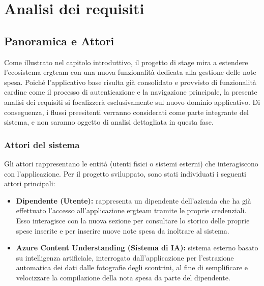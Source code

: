 \chapter{Analisi dei requisiti}
\label{chap:analisi-requisiti}

\section{Panoramica e Attori}
\noindent Come illustrato nel capitolo introduttivo, il progetto di stage mira a estendere l'ecosistema \gls{ergteam} con una nuova funzionalità dedicata alla gestione delle note spesa. Poiché l'applicativo base risulta già consolidato e provvisto di funzionalità cardine come il processo di autenticazione e la navigazione principale, la presente analisi dei requisiti si focalizzerà esclusivamente sul nuovo dominio applicativo. Di conseguenza, i flussi preesitenti verranno considerati come parte integrante del sistema, e non saranno oggetto di analisi dettagliata in questa fase. 

\subsection{Attori del sistema}
\noindent Gli attori rappresentano le entità (utenti fisici o sistemi esterni) che interagiscono con l'applicazione. Per il progetto sviluppato, sono stati individuati i seguenti attori principali:
\begin{itemize}
    \item \textbf{Dipendente (Utente):} rappresenta un dipendente dell'azienda che ha già effettuato l'accesso all'applicazione \gls{ergteam} tramite le proprie credenziali. Esso interagisce con la nuova sezione per consultare lo storico delle proprie spese inserite e per inserire nuove note spesa da inoltrare al sistema.
    
    \item \textbf{Azure Content Understanding (Sistema di IA):} sistema esterno basato su intelligenza artificiale, interrogato dall'applicazione per l'estrazione automatica dei dati dalle fotografie degli scontrini, al fine di semplificare e velocizzare la compilazione della nota spesa da parte del dipendente.
\end{itemize}




